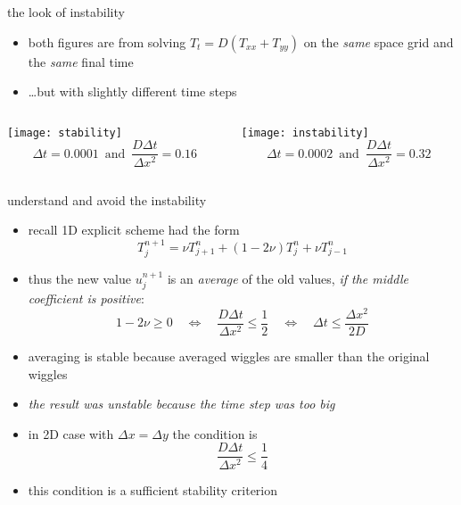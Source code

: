 \begin{frame}{the look of instability}

\begin{itemize}
\item both figures are from solving $T_t = D(T_{xx} + T_{yy})$ on the \emph{same} space grid and the \emph{same} final time
\item \dots but with slightly different time steps
\end{itemize}

\medskip
\begin{columns}
\begin{column}{0.5\textwidth}
\begin{center}
\texttt{[image: stability]}
\medskip
\small
  $$\Delta t=0.0001 \, \text{ and } \, \frac{D\Delta t}{\Delta x^2}= 0.16$$
\end{center}
\end{column}
\begin{column}{0.5\textwidth}
\begin{center}
\texttt{[image: instability]}
\small
\smallskip
  $$\Delta t=0.0002 \, \text{ and } \, \frac{D\Delta t}{\Delta x^2}= 0.32$$
\end{center}
\end{column}
\end{columns}
\end{frame}


\begin{frame}{understand and avoid the instability}
\label{slide:maxprinc}

\begin{itemize}
\item recall 1D explicit scheme had the form 
	$$T_j^{n+1} = \nu T_{j+1}^n + (1 - 2 \nu) T_j^n + \nu T_{j-1}^n$$
\item thus the new value $u_j^{n+1}$ is an \emph{average} of the old values, \emph{if the middle coefficient is positive}:
	$$1 - 2 \nu \ge 0 \quad \iff \quad  \frac{D\Delta t}{\Delta x^2} \le \frac{1}{2} \quad \iff \quad \Delta t \le \frac{\Delta x^2}{2 D}$$
\item averaging is stable because averaged wiggles are smaller than the original wiggles
\item \emph{the result was unstable because the time step was too big}

\item in 2D case with $\Delta x = \Delta y$ the condition is
	$$\frac{D\Delta t}{\Delta x^2} \le \frac{1}{4}$$
\vspace{-3mm}
\item this condition is a sufficient \alert{stability criterion}
\end{itemize}
\end{frame}


